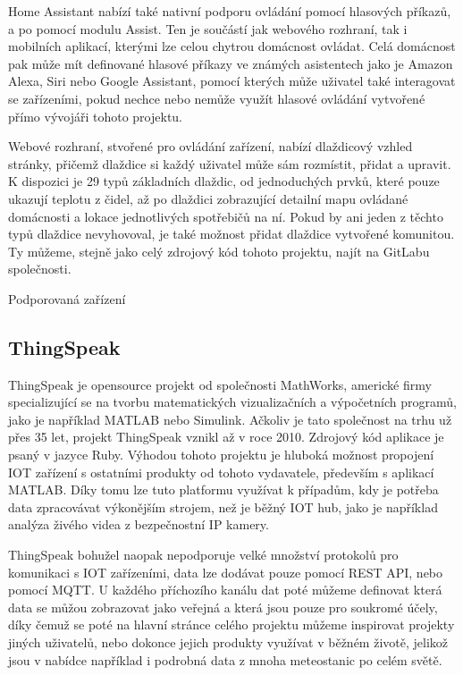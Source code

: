 Home Assistant nabízí také nativní podporu ovládání pomocí hlasových příkazů, a po pomocí modulu Assist. Ten je součástí jak webového rozhraní, tak i mobilních aplikací, kterými lze celou chytrou domácnost ovládat. Celá domácnost pak může mít definované hlasové příkazy ve známých asistentech jako je Amazon Alexa, Siri nebo Google Assistant, pomocí kterých může uživatel také interagovat se zařízeními, pokud nechce nebo nemůže využít hlasové ovládání vytvořené přímo vývojáři tohoto projektu.

Webové rozhraní, stvořené pro ovládání zařízení, nabízí dlaždicový vzhled stránky, přičemž dlaždice si každý uživatel může sám rozmístit, přidat a upravit. K dispozici je 29 typů základních dlaždic, od jednoduchých prvků, které pouze ukazují teplotu z čidel, až po dlaždici zobrazující detailní mapu ovládané domácnosti a lokace jednotlivých spotřebičů na ní. Pokud by ani jeden z těchto typů dlaždice nevyhovoval, je také možnost přidat dlaždice vytvořené komunitou. Ty můžeme, stejně jako celý zdrojový kód tohoto projektu, najít na GitLabu společnosti.

Podporovaná zařízení

\subsection{ThingSpeak}

ThingSpeak je opensource projekt od společnosti MathWorks, americké firmy specializující se na tvorbu matematických vizualizačních a výpočetních programů, jako je například MATLAB nebo Simulink. Ačkoliv je tato společnost na trhu už přes 35 let, projekt ThingSpeak vznikl až v roce 2010. Zdrojový kód aplikace je psaný v jazyce Ruby. Výhodou tohoto projektu je hluboká možnost propojení IOT zařízení s ostatními produkty od tohoto vydavatele, především s aplikací MATLAB. Díky tomu lze tuto platformu využívat k případům, kdy je potřeba data zpracovávat výkonějším strojem, než je běžný IOT hub, jako je například analýza živého videa z bezpečnostní IP kamery.

ThingSpeak bohužel naopak nepodporuje velké množství protokolů pro komunikaci s IOT zařízeními, data lze dodávat pouze pomocí REST API, nebo pomocí MQTT. U každého příchozího kanálu dat poté můžeme definovat která data se můžou zobrazovat jako veřejná a která jsou pouze pro soukromé účely, díky čemuž se poté na hlavní stránce celého projektu můžeme inspirovat projekty jiných uživatelů, nebo dokonce jejich produkty využívat v běžném životě, jelikož jsou v nabídce například i podrobná data z mnoha meteostanic po celém světě. 

